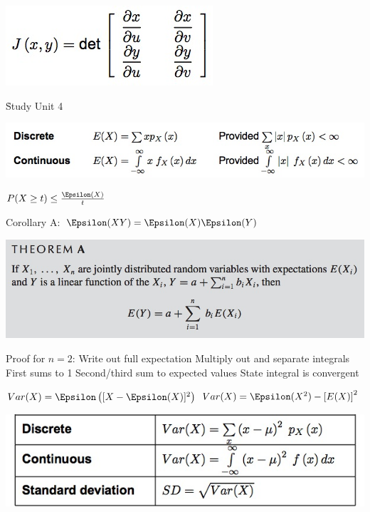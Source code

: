 \documentclass{/out/app/latex/examnotes}
\begin{document}
{
\includegraphics[scale=0.5]{./img/366.jpg}


\h{Study Unit 4}

\includegraphics[scale=0.5]{./img/41.jpg}

$P(X\ge t)\le \frac{\Epsilon(X)}{t}$

\ra Corollary A:  $\E(XY)=\E(X)\E(Y)$

\includegraphics[scale=0.4]{./img/412A.jpg}

\ra Proof for $n=2$: 
 Write out full expectation
 Multiply out and separate integrals
 First sums to 1
 Second/third sum to expected values
 State integral is convergent


$Var(X)=\E\left([X-\E(X)]^2\right) $
$Var(X)=\E(X^2)-\left[E(X)\right]^2$

\vspace{6pt}
\includegraphics[scale=0.4]{./img/42.jpg}

}
\end{document}
